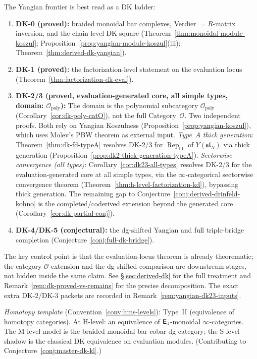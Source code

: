 \begin{remark}\label{rem:derived-dk-scope}
The Yangian frontier is best read as a DK ladder:
\begin{enumerate}[label=\textup{(\alph*)}]
\item \textbf{DK-0 (proved):} braided monoidal bar complexes,
  Verdier $= R$-matrix inversion, and the chain-level DK square
  (Theorem~\ref{thm:monoidal-module-koszul};
  Proposition~\ref{prop:yangian-module-koszul}(iii);
  Theorem~\ref{thm:derived-dk-yangian}).
\item \textbf{DK-1 (proved):} the factorization-level statement on the
  evaluation locus (Theorem~\ref{thm:factorization-dk-eval}).
\item \textbf{DK-2/3 (proved, evaluation-generated core, all simple types, domain: $\mathcal{O}_{\mathrm{poly}}$):}
  The domain is the polynomial subcategory
  $\mathcal{O}_{\mathrm{poly}}$
  (Corollary~\ref{cor:dk-poly-catO}), not the full
  Category~$\mathcal{O}$.
  Two independent proofs.  Both rely on Yangian Koszulness
  (Proposition~\ref{prop:yangian-koszul}), which uses Molev's PBW
  theorem \cite{molev-yangians} as external input.
  \emph{Type~$A$ thick generation}:
  Theorem~\ref{thm:dk-fd-typeA} resolves DK-2/3 for
  $\operatorname{Rep}_{\mathrm{fd}}$ of $Y(\mathfrak{sl}_N)$
  via thick generation
  (Proposition~\ref{prop:dk2-thick-generation-typeA}).
  \emph{Sectorwise convergence (all types)}:
  Corollary~\ref{cor:dk23-all-types} resolves DK-2/3
  for the evaluation-generated core at all
  simple types, via the $\infty$-categorical sectorwise
  convergence theorem
  (Theorem~\ref{thm:h-level-factorization-kd}), bypassing
  thick generation.  The remaining gap to
  Conjecture~\ref{conj:derived-drinfeld-kohno} is the
  completed/coderived extension beyond the generated core
  (Corollary~\ref{cor:dk-partial-conj}).
\item \textbf{DK-4/DK-5 (conjectural):} the dg-shifted Yangian and
  full triple-bridge completion
  (Conjecture~\ref{conj:full-dk-bridge}).
\end{enumerate}
The key control point is that the evaluation-locus theorem is already
theorematic; the category-$\mathcal{O}$ extension and the dg-shifted
comparison are downstream stages, not hidden inside the same claim.
See \S\ref{sec:derived-dk} for the full treatment and
Remark~\ref{rem:dk-proved-vs-remains} for the precise decomposition.
The exact extra DK-2/DK-3 packets are recorded in
Remark~\ref{rem:yangian-dk23-inputs}.

\emph{Homotopy template} (Convention~\ref{conv:hms-levels}): Type~II
(equivalence of homotopy categories).  At H-level: an equivalence of
$\mathsf{E}_1$-monoidal $\infty$-categories.  The M-level model is the braided
monoidal bar-cobar dg category; the S-level shadow is the classical DK
equivalence on evaluation modules.
(Contributing to Conjecture~\ref{conj:master-dk-kl}.)


\end{remark}
